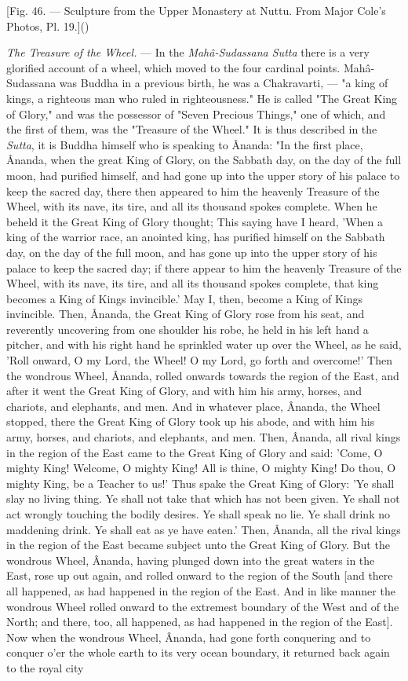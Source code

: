 \documentclass[a4paper, 11pt, oneside, polutonikogreek, english]{article}
\begin{document}
[Fig. 46. --- Sculpture from the Upper Monastery at Nuttu. From Major Cole's Photos, Pl. 19.]()

\emph{The Treasure of the Wheel.} --- In the \emph{Mahâ-Sudassana Sutta} there is a very glorified account of a wheel, which moved to the four cardinal points. Mahâ-Sudassana was Buddha in a previous birth, he was a Chakravarti, --- "a king of kings, a righteous man who ruled in righteousness." He is called "The Great King of Glory," and was the possessor of "Seven Precious Things," one of which, and the first of them, was the "Treasure of the Wheel." It is thus described in the \emph{Sutta}, it is Buddha himself who is speaking to Ânanda: "In the first place, Ânanda, when the great King of Glory, on the Sabbath day, on the day of the full moon, had purified himself, and had gone up into the upper story of his palace to keep the sacred day, there then appeared to him the heavenly Treasure of the Wheel, with its nave, its tire, and all its thousand spokes complete. When he beheld it the Great King of Glory thought; This saying have I heard, 'When a king of the warrior race, an anointed king, has purified himself on the Sabbath day, on the day of the full moon, and has gone up into the upper story of his palace to keep the sacred day; if there appear to him the heavenly Treasure of the Wheel, with its nave, its tire, and all its thousand spokes complete, that king becomes a King of Kings invincible.' May I, then, become a King of Kings invincible. Then, Ânanda, the Great King of Glory rose from his seat, and reverently uncovering from one shoulder his robe, he held in his left hand a pitcher, and with his right hand he sprinkled water up over the Wheel, as he said, 'Roll onward, O my Lord, the Wheel! O my Lord, go forth and overcome!' Then the wondrous Wheel, Ânanda, rolled onwards towards the region of the East, and after it went the Great King of Glory, and with him his army, horses, and chariots, and elephants, and men. And in whatever place, Ânanda, the Wheel stopped, there the Great King of Glory took up his abode, and with him his army, horses, and chariots, and elephants, and men. Then, Ânanda, all rival kings in the region of the East came to the Great King of Glory and said: 'Come, O mighty King! Welcome, O mighty King! All is thine, O mighty King! Do thou, O mighty King, be a Teacher to us!' Thus spake the Great King of Glory: 'Ye shall slay no living thing. Ye shall not take that which has not been given. Ye shall not act wrongly touching the bodily desires. Ye shall speak no lie. Ye shall drink no maddening drink. Ye shall eat as ye have eaten.' Then, Ânanda, all the rival kings in the region of the East became subject unto the Great King of Glory. But the wondrous Wheel, Ânanda, having plunged down into the great waters in the East, rose up out again, and rolled onward to the region of the South [and there all happened, as had happened in the region of the East. And in like manner the wondrous Wheel rolled onward to the extremest boundary of the West and of the North; and there, too, all happened, as had happened in the region of the East]. Now when the wondrous Wheel, Ânanda, had gone forth conquering and to conquer o'er the whole earth to its very ocean boundary, it returned back again to the royal city 
\end{document}
